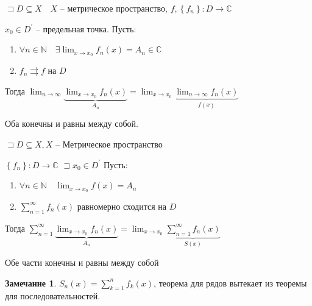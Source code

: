 \documentclass{book}
\newcommand\N{\ensuremath{\mathbb{N}}}
\renewcommand\C{\ensuremath{\mathbb{C}}}
\newcommand{\p}[1]{#1^{\prime}}
\theoremstyle{definition}
\newtheorem*{note}{Замечание}
\begin{document}
    \begin{theorem}

        $\sqsupset D\subseteq X\quad X$ -- метрическое пространство, $f, \left\{ f_n \right\} :D \to \C$

        $x_0\in \p D$ -- предельная точка. Пусть:
        \begin{enumerate}
            \item $\forall n\in \N \quad \exists \lim_{x \to x_0} f_n(x) = A_n \in \C$
            \item $f_n \rightrightarrows f$ на  $D$
        \end{enumerate}

        Тогда $\lim_{n \to \infty} \underbrace{\lim_{x \to x_0} f_n(x)}_{A_n} = \lim_{x \to x_0} \underbrace{\lim_{n \to \infty} f_n(x)}_{f(x)}$

        Оба конечны и равны между собой.
    \end{theorem}

    \begin{theorem}

        $\sqsupset D\subseteq X, X$ -- Метрическое пространство

        $\left\{ f_n \right\} :D \to \C$
        $\sqsupset x_0\in \p D$ 
        Пусть:
        \begin{enumerate}
            \item $\forall n\in \N \quad \lim_{x \to x_0} f(x) = A_n$
            \item $\sum_{n=1}^{\infty } f_n(x)$ равномерно сходится на $D$
        \end{enumerate}

        Тогда $\sum_{n=1}^{\infty } \underbrace{\lim_{x \to x_0}f_n(x)}_{A_n} = \lim_{x \to x_0} \underbrace{\sum_{n=1}^{\infty } f_n(x)}_{S(x)} $ 

        Обе части конечны и равны между собой
    \end{theorem}

    \begin{note}
        $S_n(x) = \sum_{k=1}^{n} f_k(x)$, теорема для рядов вытекает из теоремы для последовательностей.
    \end{note}
\end{document}

